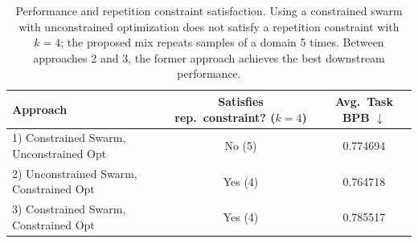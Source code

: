 \begin{table}[t]
\centering
\caption{Performance and repetition constraint satisfaction. Using a constrained swarm with unconstrained optimization does not satisfy a repetition constraint with $k=4$; the proposed mix repeats samples of a domain 5 times. Between approaches 2 and 3, the former approach achieves the best downstream performance.}
\begin{tabular}{lcc}
\toprule
Approach &
Satisfies rep.\ constraint? ($k=4$) &
Avg.\ Task BPB $\downarrow$ \\
\midrule
1) Constrained Swarm, Unconstrained Opt   & No (5)  & 0.774694 \\
\rowcolor{ai2lightpink}
2) Unconstrained Swarm, Constrained Opt  & Yes (4) & 0.764718 \\
3) Constrained Swarm, Constrained Opt    & Yes (4) & 0.785517 \\
\bottomrule
\end{tabular}
\label{tab:enforce_rep}
\end{table}
